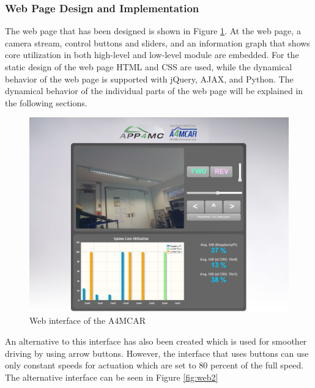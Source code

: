 \subsubsection{Web Page Design and Implementation} 
The web page that has been designed is shown in Figure \ref{fig:web}. At the web page, a camera stream, control buttons and sliders, and an information graph that shows core utilization in both high-level and low-level module are embedded. For the static design of the web page HTML and CSS are used, while the dynamical behavior of the web page is supported with jQuery, AJAX, and Python. The dynamical behavior of the individual parts of the web page will be explained in the following sections.
\begin{figure}[!ht]
	\centering
	\captionsetup{justification=centering}
	\includegraphics[width=\textwidth]{content/images/web.png}
	\caption{Web interface of the A4MCAR}
	\label{fig:web}
\end{figure}

An alternative to this interface has also been created which is used for smoother driving by using arrow buttons. However, the interface that uses buttons can use only constant speeds for actuation which are set to 80 percent of the full speed. The alternative interface can be seen in Figure \ref{fig:web2}

